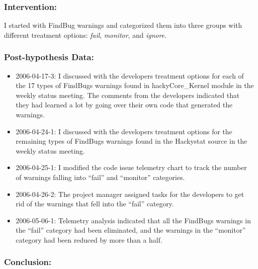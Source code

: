 \subsubsection{Intervention:}

I started with FindBug warnings and categorized them into three groups with different treatment options: \textit{fail}, \textit{monitor}, and \textit{ignore}.

\subsubsection{Post-hypothesis Data:}
\begin{itemize}
  \setlength{\itemsep}{0pt}
  \setlength{\parskip}{0pt}
  \item 2006-04-17-3: I discussed with the developers treatment options for each of the 17 types of FindBugs warnings found in hackyCore\_Kernel module in the weekly status meeting. The comments from the developers indicated that they had learned a lot by going over their own code that generated the warnings.
  \item 2006-04-24-1: I discussed with the developers treatment options for the remaining types of FindBugs warnings found in the Hackystat source in the weekly status meeting.
  \item 2006-04-25-1: I modified the code issue telemetry chart to track the number of warnings falling into ``fail'' and ``monitor'' categories.
  \item 2006-04-26-2: The project manager assigned tasks for the developers to get rid of the warnings that fell into the ``fail'' category.
  \item 2006-05-06-1: Telemetry analysis indicated that all the FindBugs warnings in the ``fail'' category had been eliminated, and the warnings in the ``monitor'' category had been reduced by more than a half.
\end{itemize}

\subsubsection{Conclusion:}

